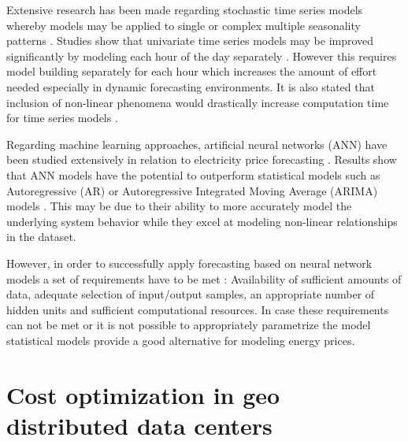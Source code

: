 Extensive research has been made regarding stochastic time series models whereby models may be applied to single \cite{garcia2005garch, weron2008forecastingWh, weron2008forecasting, nogales2002forecasting, cuaresma2004forecasting, tan2010day, conejo2005day} or complex multiple seasonality patterns \cite{de2011forecasting, gould2008forecasting, zivot2003vector}. 
Studies show that univariate time series models may be improved significantly by modeling each hour of the day separately \cite{cuaresma2004forecasting, weron2008forecasting}. However this requires model building separately for each hour which increases the amount of effort needed especially in dynamic forecasting environments. 
It is also stated that inclusion of non-linear phenomena would drastically increase computation time for time series models \cite{cuaresma2004forecasting}. 


Regarding machine learning approaches, artificial neural networks (ANN) have been studied extensively in relation to electricity price forecasting \cite{vahidinasab2008day, singhal2011electricity, pao2007forecasting, amjady2006day, catalao2007short, 
gareta2006forecasting, duanelectricity, szkuta1999electricity}. 
Results show that ANN models have the potential to outperform statistical models such as Autoregressive (AR) or Autoregressive Integrated Moving Average (ARIMA) models \cite{pao2007forecasting, catalao2007short}. This may be due to their ability to more accurately model the underlying system behavior while they excel at modeling non-linear relationships in the dataset. 

However, in order to successfully apply forecasting based on neural network models a set of requirements have to be met \cite{catalao2007short}: Availability of sufficient amounts of data, adequate selection of input/output samples, an appropriate number of hidden units and sufficient computational resources. In case these requirements can not be met or it is not possible to appropriately parametrize the model statistical models provide a good alternative for modeling energy prices. 




\section{Cost optimization in geo distributed data centers}

